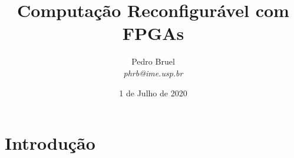 \documentclass[10pt, compress, aspectratio=169, xcolor={table,usenames,dvipsnames}]{beamer}
\title{Computação Reconfigurável com FPGAs}
\author{\footnotesize Pedro Bruel \\ {\scriptsize \emph{phrb@ime.usp.br}}}
\date{\scriptsize 1 de Julho de 2020}
\begin{document}
\maketitle

\section*{Introdução}


%
%
%
%
%


\end{document}
